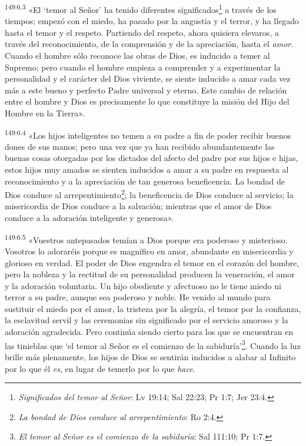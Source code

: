 \par 
\textsuperscript{149:6.3} «El `temor al Señor' ha tenido diferentes significados\footnote{\textit{Significados del temor al Señor}: Lv 19:14; Sal 22:23; Pr 1:7; Jer 23:4.} a través de los tiempos; empezó con el miedo, ha pasado por la angustia y el terror, y ha llegado hasta el temor y el respeto. Partiendo del respeto, ahora quisiera elevaros, a través del reconocimiento, de la comprensión y de la apreciación, hasta el \textit{amor}. Cuando el hombre sólo reconoce las obras de Dios, es inducido a temer al Supremo; pero cuando el hombre empieza a comprender y a experimentar la personalidad y el carácter del Dios viviente, se siente inducido a amar cada vez más a este bueno y perfecto Padre universal y eterno. Este cambio de relación entre el hombre y Dios es precisamente lo que constituye la misión del Hijo del Hombre en la Tierra».

\par 
\textsuperscript{149:6.4} «Los hijos inteligentes no temen a su padre a fin de poder recibir buenos dones de sus manos; pero una vez que ya han recibido abundantemente las buenas cosas otorgadas por los dictados del afecto del padre por sus hijos e hijas, estos hijos muy amados se sienten inducidos a amar a su padre en respuesta al reconocimiento y a la apreciación de tan generosa beneficencia. La bondad de Dios conduce al arrepentimiento\footnote{\textit{La bondad de Dios conduce al arrepentimiento}: Ro 2:4.}; la beneficencia de Dios conduce al servicio; la misericordia de Dios conduce a la salvación; mientras que el amor de Dios conduce a la adoración inteligente y generosa».

\par 
\textsuperscript{149:6.5} «Vuestros antepasados temían a Dios porque era poderoso y misterioso. Vosotros lo adoraréis porque es magnífico en amor, abundante en misericordia y glorioso en verdad. El poder de Dios engendra el temor en el corazón del hombre, pero la nobleza y la rectitud de su personalidad producen la veneración, el amor y la adoración voluntaria. Un hijo obediente y afectuoso no le tiene miedo ni terror a su padre, aunque sea poderoso y noble. He venido al mundo para sustituir el miedo por el amor, la tristeza por la alegría, el temor por la confianza, la esclavitud servil y las ceremonias sin significado por el servicio amoroso y la adoración agradecida. Pero continúa siendo cierto para los que se encuentran en las tinieblas que `el temor al Señor es el comienzo de la sabiduría'\footnote{\textit{El temor al Señor es el comienzo de la sabiduría}: Sal 111:10; Pr 1:7.}. Cuando la luz brille más plenamente, los hijos de Dios se sentirán inducidos a alabar al Infinito por lo que él \textit{es}, en lugar de temerlo por lo que \textit{hace}.


